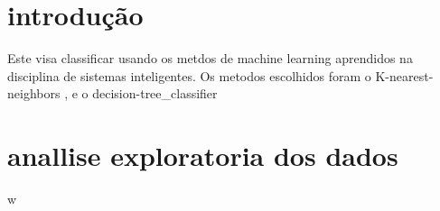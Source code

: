 \section{introdução}

Este visa classificar usando os metdos de machine learning aprendidos na disciplina
 de sistemas inteligentes. Os metodos escolhidos foram o K-nearest-neighbors , e o
 decision-tree_classifier

\section{anallise  exploratoria dos dados}
w
